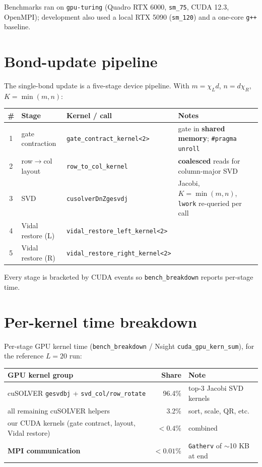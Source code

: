 \documentclass[11pt]{article}
\newcommand{\code}[1]{\texttt{#1}}
\begin{document}
Benchmarks ran on \code{gpu-turing} (Quadro RTX 6000, \code{sm\_75}, CUDA 12.3, OpenMPI); development also used a local RTX 5090 (\code{sm\_120}) and a one-core \code{g++} baseline.

\section{Bond-update pipeline}\label{app:pipeline}

\noindent The single-bond update is a five-stage device pipeline. With $m=\chi_L d$, $n=d\chi_R$, $K=\min(m,n)$:

\smallskip
\begin{center}
\begin{tabular}{clll}
\toprule
\# & Stage & Kernel / call & Notes \\
\midrule
1 & gate contraction & \code{gate\_contract\_kernel<2>} & gate in \textbf{shared memory}; \code{\#pragma unroll} \\
2 & row$\to$col layout & \code{row\_to\_col\_kernel} & \textbf{coalesced} reads for column-major SVD \\
3 & SVD & \code{cusolverDnZgesvdj} & Jacobi, $K=\min(m,n)$, \code{lwork} re-queried per call \\
4 & Vidal restore (L) & \code{vidal\_restore\_left\_kernel<2>} & \\
5 & Vidal restore (R) & \code{vidal\_restore\_right\_kernel<2>} & \\
\bottomrule
\end{tabular}
\end{center}

\smallskip
\noindent Every stage is bracketed by CUDA events so \code{bench\_breakdown} reports per-stage time.

\section{Per-kernel time breakdown}

\noindent Per-stage GPU kernel time (\code{bench\_breakdown} / Nsight \code{cuda\_gpu\_kern\_sum}), for the reference $L=20$ run:

\smallskip
\begin{center}\begin{tabular}{lrl}
\toprule
GPU kernel group & Share & Note \\
\midrule
cuSOLVER \code{gesvdbj} + \code{svd\_col/row\_rotate} & 96.4\% & top-3 Jacobi SVD kernels \\
all remaining cuSOLVER helpers & 3.2\% & sort, scale, QR, etc. \\
our CUDA kernels (gate contract, layout, Vidal restore) & $<0.4\%$ & combined \\
\textbf{MPI communication} & \textbf{$<0.01\%$} & \code{Gatherv} of $\sim$10 KB at end \\
\bottomrule
\end{tabular}
\end{center}
\end{document}
